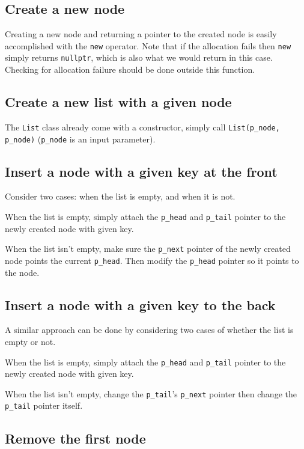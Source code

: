 \documentclass{article}
\begin{document}
\subsection{Create a new node}

Creating a new node and returning a pointer to the created node is easily accomplished with the \lstinline{new} operator. Note that if the allocation fails then \lstinline{new} simply returns \lstinline{nullptr}, which is also what we would return in this case. Checking for allocation failure should be done outside this function.

\subsection{Create a new list with a given node}

The \lstinline{List} class already come with a constructor, simply call \lstinline{List(p_node, p_node)} (\lstinline{p_node} is an input parameter).

\subsection{Insert a node with a given key at the front}

Consider two cases: when the list is empty, and when it is not.


When the list is empty, simply attach the \lstinline{p_head} and \lstinline{p_tail} pointer to the newly created node with given key.


When the list isn't empty, make sure the \lstinline{p_next} pointer of the newly created node points the current \lstinline{p_head}. Then modify the \lstinline{p_head} pointer so it points to the node.


\subsection{Insert a node with a given key to the back}

A similar approach can be done by considering two cases of whether the list is empty or not.


When the list is empty, simply attach the \lstinline{p_head} and \lstinline{p_tail} pointer to the newly created node with given key.


When the list isn't empty, change the \lstinline{p_tail}'s \lstinline{p_next} pointer then change the \lstinline{p_tail} pointer itself.


\subsection{Remove the first node}
\end{document}

